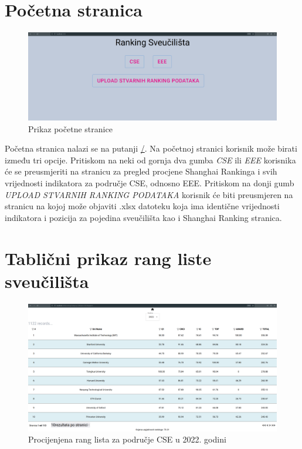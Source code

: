 \documentclass[times, utf8, zavrsni]{fer}
\begin{document}
\section{Početna stranica}

\begin{figure}[htb]
    \hspace*{-2cm}  
    \includegraphics[scale=0.2]{homePage.png} 
    \caption{Prikaz početne stranice}
    \label{fig:homepage}
    \end{figure}
Početna stranica nalazi se na putanji \url{/}. Na početnoj stranici korisnik može birati između tri opcije. Pritiskom na neki od gornja dva gumba \emph{CSE} ili \emph{EEE}
korisnika će se preusmjeriti na stranicu za pregled procjene Shanghai Rankinga i svih vrijednosti indikatora za područje CSE, odnosno EEE.        
Pritiskom na donji gumb \emph{UPLOAD STVARNIH RANKING PODATAKA} korisnik će biti preusmjeren na stranicu na kojoj može objaviti .xlsx datoteku koja ima 
identične vrijednosti indikatora i pozicija za pojedina sveučilišta kao i Shanghai Ranking stranica.
\newpage\section{Tablični prikaz rang liste sveučilišta}
\begin{figure}[htb]
    \hspace*{-2cm}  
    \includegraphics[scale=0.2]{tablica.png} 
    \caption{Procijenjena rang lista za područje CSE u 2022. godini}
    \label{fig:tablica}
    \end{figure}
\end{document}
